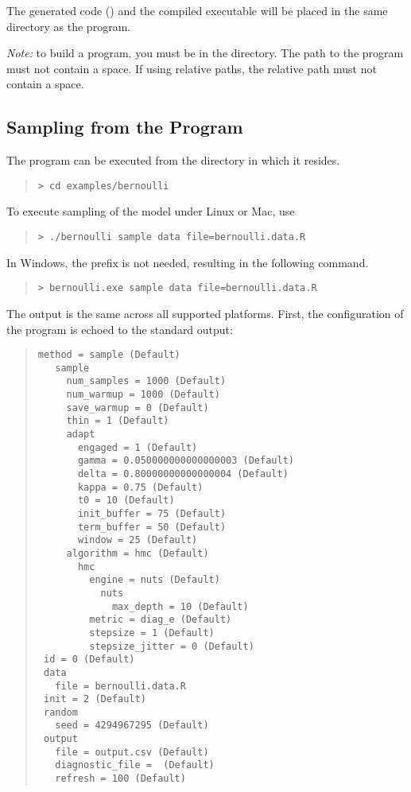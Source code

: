 The generated \Cpp code () and the compiled
executable will be placed in the same directory as the \Stan program.

\emph{Note:} to build a \Stan program, you must be in the
 directory. The path to the \Stan program must not
contain a space. If using relative paths, the relative path must not
contain a space.

\subsection{Sampling from the \Stan Program}

The program can be executed from the directory in which it resides.
%
\begin{quote}
\begin{Verbatim}[fontshape=sl]
> cd examples/bernoulli
\end{Verbatim}
\end{quote}
%
To execute sampling of the model under Linux or Mac, use
%
\begin{quote}
\begin{Verbatim}[fontshape=sl]
> ./bernoulli sample data file=bernoulli.data.R
\end{Verbatim}
\end{quote}
%
In Windows, the  prefix is not needed, resulting in the
following command.
%
\begin{quote}
\begin{Verbatim}[fontshape=sl]
> bernoulli.exe sample data file=bernoulli.data.R
\end{Verbatim}
\end{quote}
%
The output is the same across all supported platforms.  First, the
configuration of the program is echoed to the standard output:
%
\begin{quote}
\begin{Verbatim}[fontsize=\small]
 method = sample (Default)
   sample
     num_samples = 1000 (Default)
     num_warmup = 1000 (Default)
     save_warmup = 0 (Default)
     thin = 1 (Default)
     adapt
       engaged = 1 (Default)
       gamma = 0.050000000000000003 (Default)
       delta = 0.80000000000000004 (Default)
       kappa = 0.75 (Default)
       t0 = 10 (Default)
       init_buffer = 75 (Default)
       term_buffer = 50 (Default)
       window = 25 (Default)
     algorithm = hmc (Default)
       hmc
         engine = nuts (Default)
           nuts
             max_depth = 10 (Default)
         metric = diag_e (Default)
         stepsize = 1 (Default)
         stepsize_jitter = 0 (Default)
 id = 0 (Default)
 data
   file = bernoulli.data.R
 init = 2 (Default)
 random
   seed = 4294967295 (Default)
 output
   file = output.csv (Default)
   diagnostic_file =  (Default)
   refresh = 100 (Default)
\end{Verbatim}
\end{quote}
